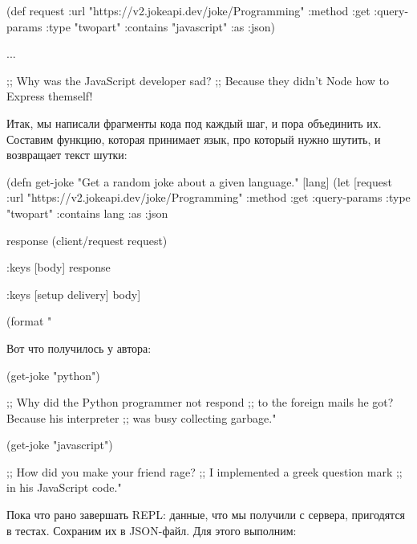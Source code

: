\begin{english}
  \begin{clojure}
(def request
  {:url "https://v2.jokeapi.dev/joke/Programming"
   :method :get
   :query-params {:type "twopart" :contains "javascript"}
   :as :json})

...

;; Why was the JavaScript developer sad?
;; Because they didn't Node how to Express themself!
  \end{clojure}
\end{english}

Итак, мы написали фрагменты кода под каждый шаг, и пора объединить их. Составим функцию, которая принимает язык, про который нужно шутить, и возвращает текст шутки:

\begin{english}
  \begin{clojure}
(defn get-joke
  "Get a random joke about a given language."
  [lang]
  (let [request
        {:url "https://v2.jokeapi.dev/joke/Programming"
         :method :get
         :query-params {:type "twopart" :contains lang}
         :as :json}

        response
        (client/request request)

        {:keys [body]}
        response

        {:keys [setup delivery]}
        body]

    (format "%
  \end{clojure}
\end{english}

\pagebreaklarge

Вот что получилось у автора:

\begin{english}
  \begin{clojure}
(get-joke "python")

;; Why did the Python programmer not respond
;; to the foreign mails he got? Because his interpreter
;; was busy collecting garbage."

(get-joke "javascript")

;; How did you make your friend rage?
;; I implemented a greek question mark
;; in his JavaScript code."
  \end{clojure}
\end{english}

Пока что рано завершать REPL: данные, что мы получили с сервера, пригодятся в тестах. Сохраним их в JSON-файл. Для этого выполним:

